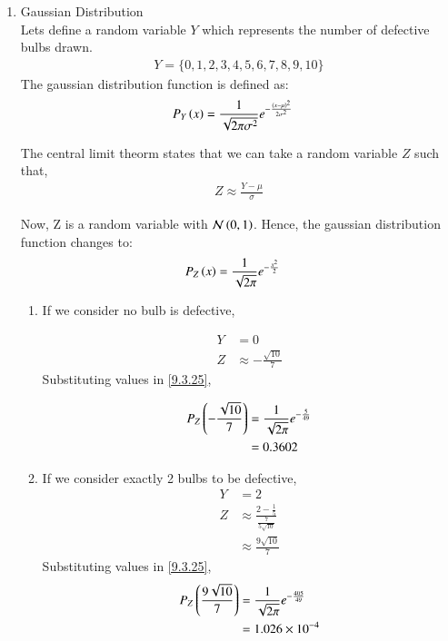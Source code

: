 \documentclass[journal,12pt,onecolumn]{IEEEtran}
\theoremstyle{remark}
\begin{document}
\begin{enumerate}[label=(\roman*)]
\item Gaussian Distribution\\
Lets define a random variable $Y$ which represents the number of defective bulbs drawn.
\begin{align}
Y = \{0,1,2,3,4,5,6,7,8,9,10\}
\end{align}
%
The gaussian distribution function is defined as:
\begin{align}
P_Y\left(x\right) &= \frac{1}{\sqrt{2\pi{\sigma}^2}} e^{-\frac{\left(x-\mu\right)^2}{2{\sigma}^2}} 
\end{align}

The central limit theorm states that we can take a random variable $Z$ such that,
\begin{align}
Z \approx \frac{Y-\mu}{\sigma}
\end{align}

Now, Z is a random variable with $\mathcal{N}\left(0,1\right)$. Hence, the gaussian distribution function changes to:
\begin{align}
P_Z\left(x\right) &= \frac{1}{\sqrt{2\pi}} e^{-\frac{{x}^2}{2}}\label{9.3.25}
\end{align}

\begin{enumerate}[label=(\alph*)]
\item If we consider no bulb is defective,

\begin{align}
Y &= 0\\
	Z &\approx -\frac{\sqrt{10}}{7}
\end{align}
Substituting values in \eqref{9.3.25},

\begin{align}
	P_Z\left(-\frac{\sqrt{10}}{7}\right)&= \frac{1}{\sqrt{2\pi}} e^{-\frac{5}{49}}\\
			      &= 0.3602
\end{align}

\item If we consider exactly 2 bulbs to be defective,
\begin{align}
	Y &= 2\\
	Z &\approx \frac{2 - \frac{1}{5}}{\frac{7}{5\sqrt{10}}}\\ 
	  &\approx \frac{9\sqrt{10}}{7}
\end{align}
Substituting values in \eqref{9.3.25},
\begin{align}
P_Z\left(\frac{9\sqrt{10}}{7}\right) &= \frac{1}{\sqrt{2\pi}} e^{-\frac{405}{49}}\\
			      &= 1.026 \times 10^{-4}
\end{align}


\end{enumerate}
\end{enumerate}
\end{document}
